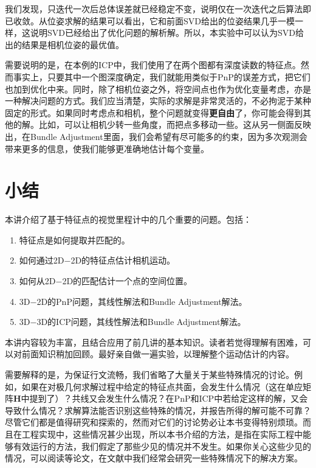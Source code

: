 我们发现，只迭代一次后总体误差就已经稳定不变，说明仅在一次迭代之后算法即已收敛。从位姿求解的结果可以看出，它和前面SVD给出的位姿结果几乎一模一样，这说明SVD已经给出了优化问题的解析解。所以，本实验中可以认为SVD给出的结果是相机位姿的最优值。

需要说明的是，在本例的ICP中，我们使用了在两个图都有深度读数的特征点。然而事实上，只要其中一个图深度确定，我们就能用类似于PnP的误差方式，把它们也加到优化中来。同时，除了相机位姿之外，将空间点也作为优化变量考虑，亦是一种解决问题的方式。我们应当清楚，实际的求解是非常灵活的，不必拘泥于某种固定的形式。如果同时考虑点和相机，整个问题就变得\textbf{更自由}了，你可能会得到其他的解。比如，可以让相机少转一些角度，而把点多移动一些。这从另一侧面反映出，在Bundle Adjustment里面，我们会希望有尽可能多的约束，因为多次观测会带来更多的信息，使我们能够更准确地估计每个变量。

\section{小结}
本讲介绍了基于特征点的视觉里程计中的几个重要的问题。包括：

\begin{enumerate}
	\item 特征点是如何提取并匹配的。
	\item 如何通过2D−2D的特征点估计相机运动。
	\item 如何从2D−2D的匹配估计一个点的空间位置。
	\item 3D−2D的PnP问题，其线性解法和Bundle Adjustment解法。
	\item 3D−3D的ICP问题，其线性解法和Bundle Adjustment解法。
\end{enumerate}

本讲内容较为丰富，且结合应用了前几讲的基本知识。读者若觉得理解有困难，可以对前面知识稍加回顾。最好亲自做一遍实验，以理解整个运动估计的内容。

需要解释的是，为保证行文流畅，我们省略了大量关于某些特殊情况的讨论。例如，如果在对极几何求解过程中给定的特征点共面，会发生什么情况（这在单应矩阵$\bm{H}$中提到了）？共线又会发生什么情况？在PnP和ICP中若给定这样的解，又会导致什么情况？求解算法能否识别这些特殊的情况，并报告所得的解可能不可靠？尽管它们都是值得研究和探索的，然而对它们的讨论势必让本书变得特别烦琐。而且在工程实现中，这些情况甚少出现，所以本书介绍的方法，是指在实际工程中能够有效运行的方法，我们假定了那些少见的情况并不发生。如果你关心这些少见的情况，可以阅读\cite{Hartley2003}等论文，在文献中我们经常会研究一些特殊情况下的解决方案。

